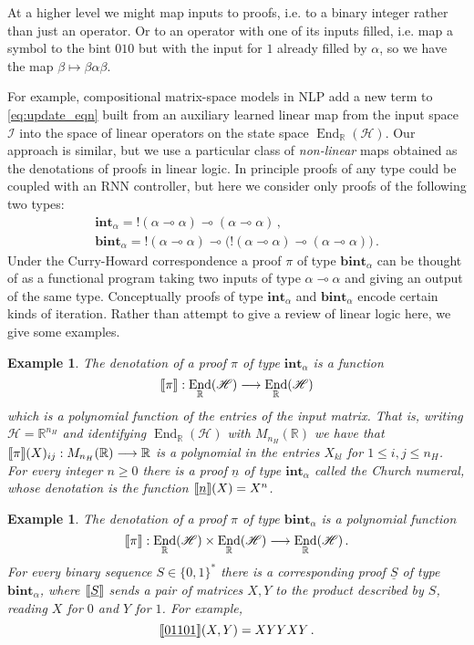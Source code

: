 \documentclass[english,letter paper,12pt,leqno]{article}
\theoremstyle{example}
\newtheorem{example}[theorem]{Example}
\numberwithin{equation}{section}
\DeclareMathOperator{\End}{End}
\begin{document}
At a higher level we might map inputs to proofs, i.e. to a binary integer rather than just an operator. Or to an operator with one of its inputs filled, i.e. map a symbol to the bint $010$ but with the input for $1$ already filled by $\alpha$, so we have the map $\beta \mapsto \beta \alpha \beta$.

For example, compositional matrix-space models in NLP \cite{irsoy} add a new term to \eqref{eq:update_eqn} built from an auxiliary learned linear map from the input space $\mathscr{I}$ into the space of linear operators on the state space $\End_{\mathbb{R}}(\mathscr{H})$. Our approach is similar, but we use a particular class of \emph{non-linear} maps obtained as the denotations of proofs in linear logic. In principle proofs of any type could be coupled with an RNN controller, but here we consider only proofs of the following two types:
\begin{gather*}
\textbf{int}_\alpha = {!}(\alpha \multimap \alpha) \multimap (\alpha \multimap \alpha)\,,\\
\textbf{bint}_\alpha = {!}(\alpha \multimap \alpha) \multimap \big({!}(\alpha \multimap \alpha) \multimap (\alpha \multimap \alpha)\big)\,.
\end{gather*}
Under the Curry-Howard correspondence a proof $\pi$ of type $\textbf{bint}_\alpha$ can be thought of as a functional program taking two inputs of type $\alpha \multimap \alpha$ and giving an output of the same type. Conceptually proofs of type $\textbf{int}_\alpha$ and $\textbf{bint}_\alpha$ encode certain kinds of iteration. Rather than attempt to give a review of linear logic here, we give some examples.

\begin{example}\label{example_1} The \emph{denotation} of a proof $\pi$ of type $\textbf{int}_\alpha$ is a function
\[
\den{\pi}: \End_{\mathbb{R}}(\mathscr{H}) \lto \End_{\mathbb{R}}(\mathscr{H})
\]
which is a polynomial function of the entries of the input matrix. That is, writing $\mathscr{H} = \mathbb{R}^{n_H}$ and identifying $\End_{\mathbb{R}}(\mathscr{H})$ with $M_{n_H}(\mathbb{R})$ we have that $\llbracket \pi \rrbracket(X)_{ij}: M_{n_H}(\mathbb{R}) \longrightarrow \mathbb{R}$ is a polynomial in the entries $X_{kl}$ for $1 \le i, j \le n_H$. For every integer $n \ge 0$ there is a proof $\underline{n}$ of type $\textbf{int}_\alpha$ called the \emph{Church numeral}, whose denotation is the function $\llbracket \underline{n} \rrbracket(X) = X^n$.
\end{example}

\begin{example}\label{example_2} The denotation of a proof $\pi$ of type $\textbf{bint}_\alpha$ is a polynomial function
\[
\den{\pi}: \End_{\mathbb{R}}(\mathscr{H}) \times \End_{\mathbb{R}}(\mathscr{H}) \lto \End_{\mathbb{R}}(\mathscr{H})\,.
\]
For every binary sequence $S \in \{0,1\}^*$ there is a corresponding proof $\underline{S}$ of type $\textbf{bint}_\alpha$, where $\llbracket \underline{S} \rrbracket$ sends a pair of matrices $X,Y$ to the product described by $S$, reading $X$ for $0$ and $Y$ for $1$. For example,
\[
\llbracket \underline{01101} \rrbracket(X,Y) = X Y Y X Y\,.
\]
\end{example}
\end{document}
